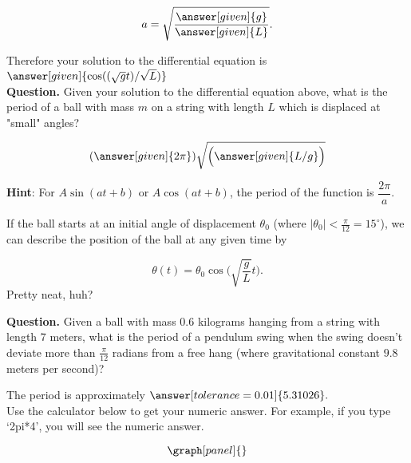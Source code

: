 \documentclass[handout,nooutcomes]{ximera}
\begin{document}
\begin{example}
\begin{explanation}
\[
a = \sqrt{\dfrac{\answer[given]{g}}{\answer[given]{L}}}.
\]


Therefore your solution to the differential equation is $\answer[given]{ \cos((\sqrt{g}t)/\sqrt{L})}$\\



\textbf{Question. } Given your solution to the differential equation above, what is the period of a ball with mass $m$ on a string with length $L$ which is displaced at "small" angles?

\[
(\answer[given]{2\pi})\sqrt{\Big(\answer[given]{L/g}\Big)}
\]
\medskip

\textbf{Hint}: For $A\sin(at+b)$ or $A\cos(at+b)$, the period of the 
function is $\dfrac{2\pi}{a}$.


If the ball starts at an initial angle of displacement $\theta_0$
(where $|\theta_0|<\frac{\pi}{12}= 15^\circ$), we can describe
the position of the ball at any given time by

\[
\theta(t) = \theta_0 \cos\Big(\sqrt{\frac{g}{L}} t\Big).
\]
Pretty neat, huh?


\textbf{Question. } Given a ball with mass $0.6$ kilograms hanging from a string with length $7$ meters, what is the period of a pendulum swing when the swing doesn't deviate more than $\frac{\pi}{12}$ radians from a free hang (where gravitational constant $9.8$ meters per second)?

The period is approximately $\answer[tolerance=0.01]{5.31026}.$\\

Use the calculator below to get your numeric answer. For example, if you type
`2pi*4', you will see the numeric answer.

\[
\graph[panel]{}
\]


\end{explanation}
\end{example}
\end{document}
